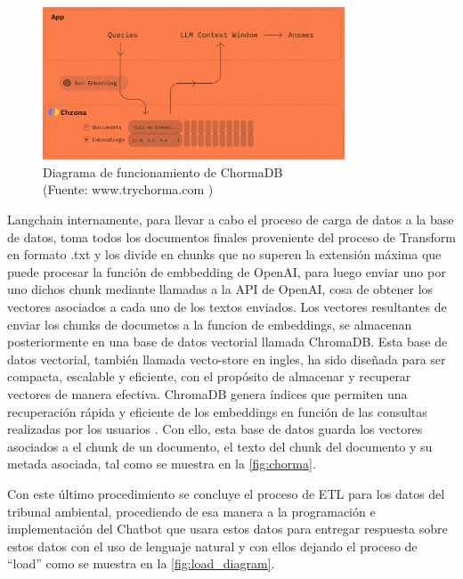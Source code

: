 \begin{figure}[ht!]
    \centering
    \includegraphics[width=0.8\textwidth]{figures/chorma.png}
    \caption[Diagrama de funcionamiento de ChormaDB]{Diagrama de funcionamiento de ChormaDB\\
    {\scriptsize (Fuente: www.trychorma.com \cite{trychromaAInativeOpensource})}}
    \label{fig:chorma}
\end{figure}

\newpage

\par Langchain internamente, para llevar a cabo el proceso de carga de datos a la base de datos, toma todos los documentos finales proveniente del proceso de Transform en formato .txt y los divide en chunks que no superen la extensión máxima que puede procesar la función de embbedding de OpenAI, para luego enviar uno por uno dichos chunk mediante llamadas a la API de OpenAI, cosa de obtener los vectores asociados a cada uno de los textos enviados. 
Los vectores resultantes de enviar los chunks de documetos a la funcion de embeddings, se almacenan posteriormente en una base de datos vectorial llamada ChromaDB. Esta base de 
datos vectorial, también llamada vecto-store en ingles, ha sido diseñada para ser compacta, escalable y eficiente, con el propósito de almacenar y recuperar vectores de manera 
efectiva. ChromaDB genera índices que permiten una recuperación rápida y eficiente de los embeddings en función de las 
consultas realizadas por los usuarios \cite{langchain1}. Con ello, esta base de datos guarda los vectores asociados a el chunk de un documento, 
el texto del chunk del documento y su metada asociada, tal como se muestra en la \autoref{fig:chorma}.


\par Con este último procedimiento se concluye el proceso de ETL para los datos del tribunal ambiental, procediendo de esa manera 
a la programación e implementación del Chatbot que usara estos datos para entregar respuesta sobre estos datos con el uso de 
lenguaje natural y con ellos dejando el proceso de ``load'' como se muestra en la \autoref{fig:load_diagram}.\\


